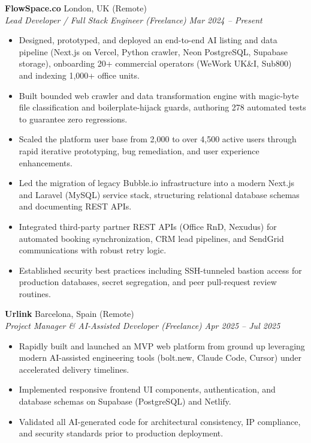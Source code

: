 \documentclass[10pt, a4paper]{article}
\begin{document}
\textbf{FlowSpace.co} \hfill London, UK (Remote) \\
\textit{Lead Developer / Full Stack Engineer (Freelance)} \hfill \textit{Mar 2024 -- Present}
\begin{itemize}
    \item Designed, prototyped, and deployed an end-to-end AI listing and data pipeline (Next.js on Vercel, Python crawler, Neon PostgreSQL, Supabase storage), onboarding 20+ commercial operators (WeWork UK\&I, Sub800) and indexing 1,000+ office units.
    \item Built bounded web crawler and data transformation engine with magic-byte file classification and boilerplate-hijack guards, authoring 278 automated tests to guarantee zero regressions.
    \item Scaled the platform user base from 2,000 to over 4,500 active users through rapid iterative prototyping, bug remediation, and user experience enhancements.
    \item Led the migration of legacy Bubble.io infrastructure into a modern Next.js and Laravel (MySQL) service stack, structuring relational database schemas and documenting REST APIs.
    \item Integrated third-party partner REST APIs (Office RnD, Nexudus) for automated booking synchronization, CRM lead pipelines, and SendGrid communications with robust retry logic.
    \item Established security best practices including SSH-tunneled bastion access for production databases, secret segregation, and peer pull-request review routines.
\end{itemize}

\vspace{3pt}
\textbf{Urlink} \hfill Barcelona, Spain (Remote) \\
\textit{Project Manager \& AI-Assisted Developer (Freelance)} \hfill \textit{Apr 2025 -- Jul 2025}
\begin{itemize}
    \item Rapidly built and launched an MVP web platform from ground up leveraging modern AI-assisted engineering tools (bolt.new, Claude Code, Cursor) under accelerated delivery timelines.
    \item Implemented responsive frontend UI components, authentication, and database schemas on Supabase (PostgreSQL) and Netlify.
    \item Validated all AI-generated code for architectural consistency, IP compliance, and security standards prior to production deployment.
\end{itemize}
\end{document}
